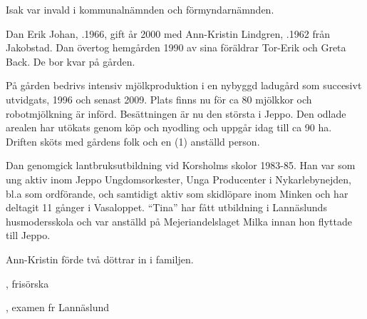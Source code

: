 Isak var invald i kommunalnämnden och förmyndarnämnden.
\begin{jhchildren}
  \item {}
  \item {}
  \item {}
  \item {}
  \item {}
  \item {}
  \item {}
\end{jhchildren}



%



%
Dan Erik Johan, .1966, gift år 2000 med Ann-Kristin Lindgren, .1962 från Jakobstad. Dan övertog hemgården 1990 av sina  föräldrar Tor-Erik och Greta Back. De bor kvar på gården.

På gården bedrivs intensiv mjölkproduktion i en nybyggd ladugård som succesivt utvidgats, 1996 och senast 2009. Plats finns nu för ca 80 mjölkkor och robotmjölkning är införd. Besättningen är nu den största i Jeppo. Den odlade arealen har utökats genom köp och nyodling och uppgår idag till ca 90 ha. Driften sköts med gårdens folk och en (1) anställd person.

Dan genomgick lantbruksutbildning vid Korsholms skolor 1983-85. Han var som ung aktiv inom Jeppo Ungdomsorkester, Unga Producenter i Nykarlebynejden, bl.a som ordförande, och samtidigt aktiv som skidlöpare inom Minken och har deltagit 11 gånger i Vasaloppet. ``Tina'' har fått utbildning i Lannäslunds husmodersskola och var anställd på Mejeriandelslaget Milka innan hon flyttade till Jeppo.

Ann-Kristin förde två döttrar in i familjen.
\begin{jhchildren}
  \item {}, frisörska
  \item {}, examen fr Lannäslund
\end{jhchildren}


